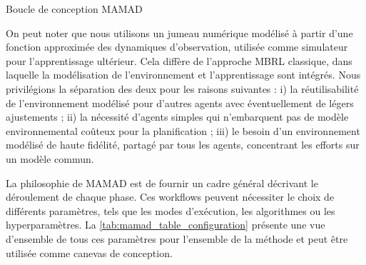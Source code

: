 \begin{algorithm}[H]
    \caption{Boucle de conception MAMAD}
    \label{alg:mamad-loop}
    \DontPrintSemicolon
\end{algorithm}

On peut noter que nous utilisons un jumeau numérique modélisé à partir d'une fonction approximée des dynamiques d'observation, utilisée comme simulateur pour l'apprentissage ultérieur. Cela diffère de l'approche MBRL classique, dans laquelle la modélisation de l'environnement et l'apprentissage sont intégrés. Nous privilégions la séparation des deux pour les raisons suivantes :  
i) la réutilisabilité de l'environnement modélisé pour d'autres agents avec éventuellement de légers ajustements ;  
ii) la nécessité d'agents simples qui n'embarquent pas de modèle environnemental coûteux pour la planification ;  
iii) le besoin d'un environnement modélisé de haute fidélité, partagé par tous les agents, concentrant les efforts sur un modèle commun.

La philosophie de MAMAD est de fournir un cadre général décrivant le déroulement de chaque phase. Ces workflows peuvent nécessiter le choix de différents paramètres, tels que les modes d'exécution, les algorithmes ou les hyperparamètres. La \autoref{tab:mamad_table_configuration} présente une vue d'ensemble de tous ces paramètres pour l'ensemble de la méthode et peut être utilisée comme canevas de conception.

